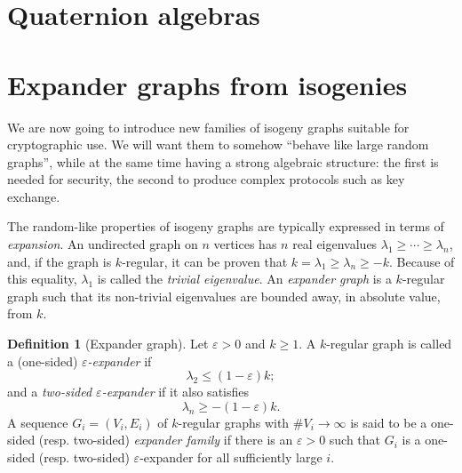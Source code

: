 \documentclass{report}
\theoremstyle{plain}
\theoremstyle{definition}
\newtheorem{definition}[theorem]{Definition}
\begin{document}

\section{Quaternion algebras}

%


\section{Expander graphs from isogenies}

We are now going to introduce new families of isogeny graphs suitable
for cryptographic use. %
We will want them to somehow ``behave like large random graphs'',
while at the same time having a strong algebraic structure: the first
is needed for security, the second to produce complex protocols such
as key exchange. %

The random-like properties of isogeny graphs are typically expressed
in terms of \emph{expansion}. %
An undirected graph on $n$ vertices has $n$ real eigenvalues
$λ_1≥\cdots≥λ_n$, and, if the graph is $k$-regular, it can be proven
that $k=λ_1≥λ_n≥-k$. %
Because of this equality, $λ_1$ is called the \emph{trivial
  eigenvalue}. %
An \emph{expander graph} is a $k$-regular graph such that its
non-trivial eigenvalues are bounded away, in absolute value, from
$k$. %

\begin{definition}[Expander graph]
  Let $ε>0$ and $k≥1$. A $k$-regular graph is called a (one-sided)
  \emph{$ε$-expander} if
  \[λ_2≤(1-ε)k;\]
  and a \emph{two-sided $ε$-expander} if it also satisfies
  \[λ_n≥-(1-ε)k.\] %
  A sequence $G_i=(V_i,E_i)$ of $k$-regular graphs with $\#V_i→∞$ is
  said to be a one-sided (resp. two-sided) \emph{expander family} if
  there is an $ε>0$ such that $G_i$ is a one-sided (resp. two-sided)
  $ε$-expander for all sufficiently large $i$.
\end{definition}
\end{document}
